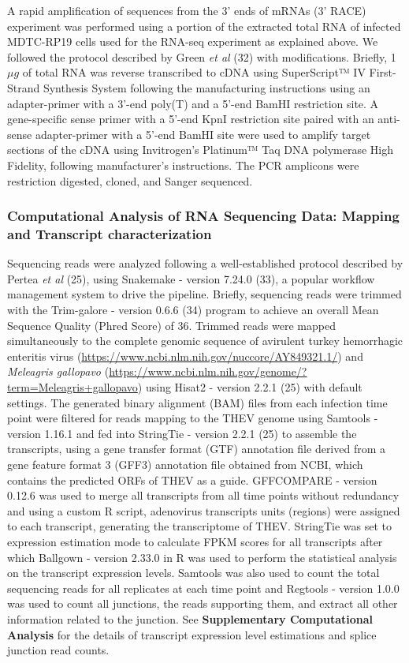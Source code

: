 \documentclass[
]{article}
\begin{document}
A rapid amplification of sequences from the 3' ends of mRNAs (3' RACE)
experiment was performed using a portion of the extracted total RNA of
infected MDTC-RP19 cells used for the RNA-seq experiment as explained
above. We followed the protocol described by Green \emph{et al} (32)
with modifications. Briefly, 1\(\mu g\) of total RNA was reverse
transcribed to cDNA using SuperScript™ IV First-Strand Synthesis System
following the manufacturing instructions using an adapter-primer with a
3'-end poly(T) and a 5'-end BamHI restriction site. A gene-specific
sense primer with a 5'-end KpnI restriction site paired with an
anti-sense adapter-primer with a 5'-end BamHI site were used to amplify
target sections of the cDNA using Invitrogen's Platinum™ Taq DNA
polymerase High Fidelity, following manufacturer's instructions. The PCR
amplicons were restriction digested, cloned, and Sanger sequenced.

\subsubsection{Computational Analysis of RNA Sequencing Data: Mapping
and Transcript
characterization}\label{computational-analysis-of-rna-sequencing-data-mapping-and-transcript-characterization}

Sequencing reads were analyzed following a well-established protocol
described by Pertea \emph{et al} (25), using Snakemake - version 7.24.0
(33), a popular workflow management system to drive the pipeline.
Briefly, sequencing reads were trimmed with the Trim-galore - version
0.6.6 (34) program to achieve an overall Mean Sequence Quality (Phred
Score) of 36. Trimmed reads were mapped simultaneously to the complete
genomic sequence of avirulent turkey hemorrhagic enteritis virus
(\url{https://www.ncbi.nlm.nih.gov/nuccore/AY849321.1/}) and
\emph{Meleagris gallopavo}
(\url{https://www.ncbi.nlm.nih.gov/genome/?term=Meleagris+gallopavo})
using Hisat2 - version 2.2.1 (25) with default settings. The generated
binary alignment (BAM) files from each infection time point were
filtered for reads mapping to the THEV genome using Samtools - version
1.16.1 and fed into StringTie - version 2.2.1 (25) to assemble the
transcripts, using a gene transfer format (GTF) annotation file derived
from a gene feature format 3 (GFF3) annotation file obtained from NCBI,
which contains the predicted ORFs of THEV as a guide. GFFCOMPARE -
version 0.12.6 was used to merge all transcripts from all time points
without redundancy and using a custom R script, adenovirus transcripts
units (regions) were assigned to each transcript, generating the
transcriptome of THEV. StringTie was set to expression estimation mode
to calculate FPKM scores for all transcripts after which Ballgown -
version 2.33.0 in R was used to perform the statistical analysis on the
transcript expression levels. Samtools was also used to count the total
sequencing reads for all replicates at each time point and Regtools -
version 1.0.0 was used to count all junctions, the reads supporting
them, and extract all other information related to the junction. See
\textbf{Supplementary Computational Analysis} for the details of
transcript expression level estimations and splice junction read counts.
\end{document}
